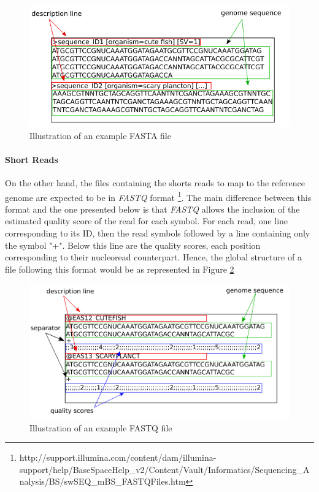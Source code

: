 \begin{figure}[H]
    \centering
    \includegraphics[scale = 0.5]{Figures/fastaex.png}
    \caption{Illustration of an example FASTA file }
    \label{fig:fasta}
\end{figure}

\paragraph{Short Reads}
On the other hand, the files containing the shorts reads to map to the reference genome are expected to be in \textsl{FASTQ} format \footnote{http://support.illumina.com/content/dam/illumina-support/help/BaseSpaceHelp_v2/Content/Vault/Informatics/Sequencing_Analysis/BS/swSEQ_mBS_FASTQFiles.htm}. The main difference between this format and the one presented below is that \textsl{FASTQ} allows the inclusion of the estimated quality score of the read for each symbol. For each read, one line corresponding to its ID, then the read symbols followed by a line containing only the symbol "+". Below this line are the quality scores, each position corresponding to their nucleoread counterpart. Hence, the global structure of a file following this format would be as represented in Figure \ref{fig:fastq}


\begin{figure}[H]
    \centering
    \includegraphics[scale = 0.35]{Figures/fastqex.png}
    \caption{Illustration of an example FASTQ file }
    \label{fig:fastq}
\end{figure}

